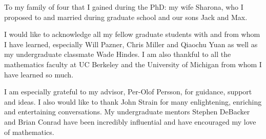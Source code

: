 \documentclass{ucbthesis}
\theoremstyle{definition}
\begin{document}



\maketitle
\copyrightpage



\begin{frontmatter}

\begin{dedication}
\null\vfil
\begin{center}
To my family of four that I gained during the PhD: my wife Sharona, who
I proposed to and married during graduate school and our sons Jack and Max.
\end{center}
\vfil\null
\end{dedication}

\tableofcontents
\clearpage
\listoffigures
\clearpage
\listoftables

\begin{acknowledgements}
I would like to acknowledge all my fellow graduate students with and from
whom I have learned, especially Will Pazner, Chris Miller and
Qiaochu Yuan as well as my undergraduate classmate Wade Hindes. I am also
thankful to all the mathematics faculty at UC Berkeley and the
University of Michigan from whom I have learned so much.

I am especially grateful to my advisor, Per-Olof Persson, for guidance,
support and ideas. I also would like to thank John Strain for many
enlightening, enriching and entertaining conversations. My undergraduate
mentors Stephen DeBacker and Brian Conrad have been incredibly influential
and have encouraged my love of mathematics.
\end{acknowledgements}

\end{frontmatter}

\pagestyle{headings}











\appendix



\end{document}
